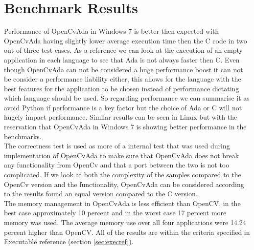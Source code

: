\section{Benchmark Results}
Performance of OpenCvAda in Windows 7 is better then expected with OpenCvAda having slightly lower average execution time then the C code in two out of three test cases. As a reference we can look at the execution of an empty application in each language to see that Ada is not always faster then C. Even though OpenCvAda can not be considered a huge performance boost it can not be consider a performance liability either, this allows for the language with the best features for the application to be chosen instead of performance dictating which language should be used. So regarding performance we can summarise it as avoid Python if performance is a key factor but the choice of Ada or C will not hugely impact performance. Similar results can be seen in Linux but with the reservation that OpenCvAda in Windows 7 is showing better performance in the benchmarks.
\\
The correctness test is used as more of a internal test that was used during implementation of OpenCvAda to make sure that OpenCvAda does not break any functionality from OpenCv and that a port between the two is not too complicated. If we look at both the complexity of the samples compared to the OpenCv version and the functionality, OpenCvAda can be considered according to the results found an equal version compared to the C version.
\\
The memory management in OpenCvAda is less efficient than OpenCV, in the best case approximately 10 percent and in the worst case 17 percent more memory was used. The average memory use over all four applications were 14.24 percent higher than OpenCV. All of the results are within the criteria specified in Executable reference (section \ref{sec:execref}).
